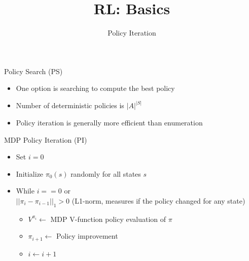 


\title[Reinforcement Learning: Basics]{RL: Basics}
\subtitle{Policy Iteration}




	
	\maketitle

\begin{frame}[c]{Policy Search (PS)}

\begin{itemize}
	\item One option is searching to compute the best policy
	\item Number of deterministic policies is $|A|^{|S|}$
	\item Policy iteration is generally more efficient than enumeration
\end{itemize}

\end{frame}
\begin{frame}[c]{MDP Policy Iteration (PI)}

\begin{itemize}
	\item Set $i=0$
	\item Initialize $\pi_0(s)$ randomly for all states $s$
	\item While $i == 0$ or\\ $||\pi_i - \pi_{i-1}||_1 > 0$ (L1-norm, measures if the policy changed for any state)
	\begin{itemize}
		\item $V^{\pi_i} \gets$ MDP V-function policy evaluation of $\pi$
		\item $\pi_{i+1} \gets$ Policy improvement
		\item $i \gets i+1$
	\end{itemize}
\end{itemize}

\end{frame}

